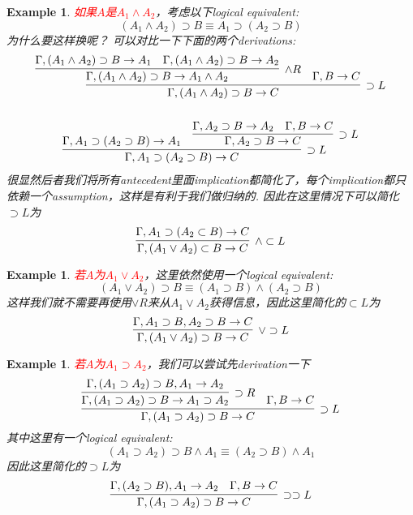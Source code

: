 \documentclass{article}
\theoremstyle{plain}
\newtheorem{example}[theorem]{Example}
\theoremstyle{nonumberplain}
\newcommand{\redt}[1]{\textcolor{red}{#1}}
\begin{document}
\begin{example}
\rm \redt{如果$A$是$A_1 \wedge A_2$}，考虑以下logical equivalent:
$$
(A_1 \wedge A_2) \supset B \equiv A_1 \supset (A_2 \supset B)
$$
为什么要这样换呢？ 可以对比一下下面的两个derivations:
$$
\begin{gathered}
\infer[\supset L]{\Gamma, (A_1 \wedge A_2) \supset B \to C}{\infer[\wedge R]{\Gamma, (A_1 \wedge A_2) \supset B \to A_1 \wedge A_2}{\Gamma, (A_1 \wedge A_2) \supset B \to A_1  & \Gamma, (A_1 \wedge A_2) \supset B \to  A_2} & \Gamma, B \to C} \\\\
\infer[\supset L]{\Gamma,A_1 \supset (A_2 \supset B) \to C}{\Gamma,A_1 \supset (A_2 \supset B) \to A_1 & \infer[\supset L]{\Gamma,A_2 \supset B \to C}{\Gamma, A_2 \supset B \to A_2 &  \Gamma, B \to C}}
\end{gathered}
$$
很显然后者我们将所有antecedent里面implication都简化了，每个implication都只依赖一个assumption，这样是有利于我们做归纳的. 因此在这里情况下可以简化$\supset L$为
$$
\infer[\wedge \subset L]{\Gamma, (A_1 \vee A_2) \subset B \to C}{\Gamma, A_1 \supset (A_2 \subset B) \to C}
$$
\end{example}

\begin{example}
\rm \redt{若$A$为$A_1 \vee A_2$}，这里依然使用一个logical equivalent:
$$
(A_1 \vee A_2) \supset B  \equiv (A_1 \supset B) \wedge (A_2 \supset B)
$$
这样我们就不需要再使用$\vee R$来从$A_1 \vee A_2$获得信息，因此这里简化的$\subset L$为
$$
\infer[\vee \supset L]{\Gamma, (A_1 \vee A_2) \supset B  \to C}{\Gamma, A_1 \supset B, A_2 \supset B \to C}
$$
\end{example}

\begin{example}
\rm \redt{若$A$为$A_1 \supset A_2$}，我们可以尝试先derivation一下
$$
\infer[\supset L]{\Gamma,(A_1 \supset A_2) \supset B \to C}{\infer[\supset R]{\Gamma,(A_1 \supset A_2) \supset B \to A_1 \supset A_2}{\Gamma,(A_1 \supset A_2) \supset B, A_1 \to A_2} & \Gamma, B \to C}
$$
其中这里有一个logical equivalent:
$$
(A_1 \supset A_2) \supset B  \wedge A_1 \equiv (A_2 \supset B) \wedge A_1
$$
因此这里简化的$\supset L$为
$$
\infer[\supset\supset L]{\Gamma,(A_1 \supset A_2) \supset B \to C}{\Gamma, (A_2 \supset B), A_1 \to A_2 & \Gamma, B \to C}
$$
\end{example}
\end{document}
